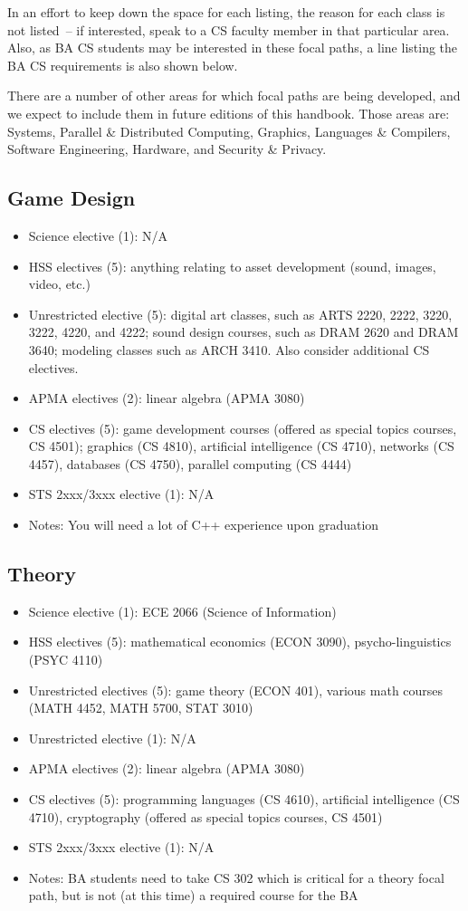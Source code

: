 \documentclass[10pt,letter]{book}
\newenvironment{itemlist}{
\begin{itemize}
\setlength{\itemsep}{0pt}
\setlength{\parskip}{0pt}}
{\end{itemize}}
\begin{document}
In an effort to keep down the space for each listing, the reason for
each class is not listed~-- if interested, speak to a CS faculty
member in that particular area. Also, as BA CS students may be
interested in these focal paths, a line listing the BA CS requirements
is also shown below.

There are a number of other areas for which focal paths are being
developed, and we expect to include them in future editions of this
handbook. Those areas are: Systems, Parallel \& Distributed Computing,
Graphics, Languages \& Compilers, Software Engineering, Hardware, and
Security \& Privacy.


\subsection{Game Design}
\begin{itemlist}
\item Science elective (1): N/A
\item HSS electives (5): anything relating to asset development
  (sound, images, video, etc.)
\item Unrestricted elective (5): digital art classes, such as ARTS
  2220, 2222, 3220, 3222, 4220, and 4222; sound design courses, such
  as DRAM 2620 and DRAM 3640; modeling classes such as ARCH 3410.
  Also consider additional CS electives.
\item APMA electives (2): linear algebra (APMA 3080)
\item CS electives (5): game development courses (offered as special
  topics courses, CS 4501); graphics (CS 4810), artificial
  intelligence (CS 4710), networks (CS 4457), databases (CS 4750),
  parallel computing (CS 4444)
\item STS 2xxx/3xxx elective (1): N/A
\item Notes: You will need a lot of C++ experience upon graduation
\end{itemlist}

\subsection{Theory}
\begin{itemlist}
\item Science elective (1): ECE 2066 (Science of Information)
\item HSS electives (5): mathematical economics (ECON 3090),
  psycho-linguistics (PSYC 4110)
\item Unrestricted electives (5): game theory (ECON 401), various math
  courses (MATH 4452, MATH 5700, STAT 3010)
\item Unrestricted elective (1): N/A
\item APMA electives (2): linear algebra (APMA 3080)
\item CS electives (5): programming languages (CS 4610), artificial
  intelligence (CS 4710), cryptography (offered as special topics
  courses, CS 4501)
\item STS 2xxx/3xxx elective (1): N/A
\item Notes: BA students need to take CS 302 which is critical for a
  theory focal path, but is not (at this time) a required course for
  the BA
\end{itemlist}
\end{document}
